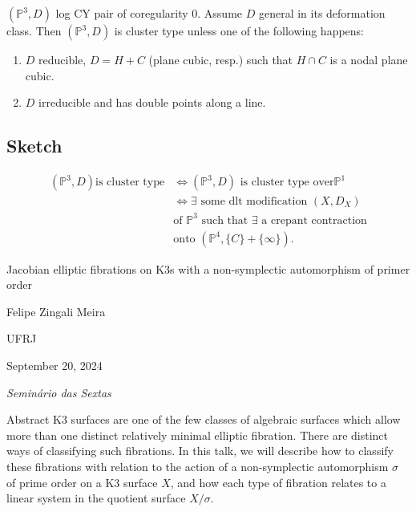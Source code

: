 \begin{thm}\leavevmode
	$(\mathbb{P}^3,D)$ log CY pair of coregularity 0.  Assume $D$ general in its deformation class. Then $(\mathbb{P}^3,D)$ is cluster type unless one of the following happens:
	\begin{enumerate}[label=(\roman*)]
		\item $D$ reducible, $D=H+C$ (plane cubic, resp.) such that $H\cap C$ is a nodal plane cubic.

		\item $D$ irreducible and has double points along a line.
	\end{enumerate}
\end{thm}

\subsection{Sketch}

\begin{align*}
	(\mathbb{P}^3,D)\text{is cluster type}  &\iff(\mathbb{P}^3,D) \text{ is cluster type over}\mathbb{P}^1\\
	&\iff\exists \text{ some dlt modification } (X,D_X)\\
	&\text{of $\mathbb{P}^3$ such that $\exists $ a crepant contraction}\\
	&\text{onto $(\mathbb{P}^4,\{C\} +\{\infty\} )$} .
\end{align*}

\clearpage{}
{\Huge Jacobian elliptic fibrations on K3s with a non-symplectic automorphism of primer order}

\hfill{\Large Felipe Zingali Meira}

{\Large \hfill UFRJ}

\hfill{\large September 20, 2024

\hfill \textit{Seminário das Sextas}}

\vspace{2em}

\begin{thing4}{Abstract}
K3 surfaces are one of the few classes of algebraic surfaces which allow more than one distinct relatively minimal elliptic fibration. There are distinct ways of classifying such fibrations. In this talk, we will describe how to classify these fibrations with relation to the action of a non-symplectic automorphism $\sigma$ of prime order on a K3 surface $X$, and how each type of fibration relates to a linear system in the quotient surface $X/\sigma$.
\end{thing4}
\vspace{2em}

